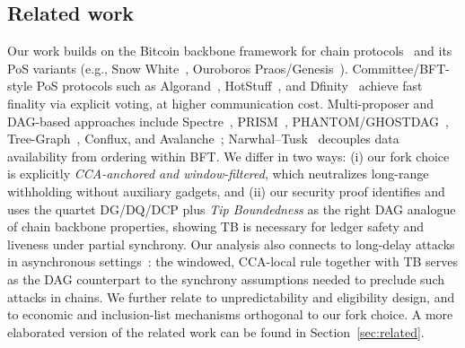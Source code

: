 \subsection{Related work} %
Our work builds on the Bitcoin backbone framework for chain protocols~\cite{EC:GarKiaLeo15} and its PoS variants (e.g., Snow White~\cite{FC:DaiPasShi19}, Ouroboros Praos/Genesis~\cite{EC:DGKR18,CCS:BGKRZ18}). Committee/BFT-style PoS protocols such as Algorand~\cite{Algorand}, HotStuff~\cite{HotStuff}, and Dfinity~\cite{Dfinity} achieve fast finality via explicit voting, at higher communication cost. Multi-proposer and DAG-based approaches include Spectre~\cite{EPRINT:MorKulYok18}, PRISM~\cite{Prism}, PHANTOM/GHOSTDAG~\cite{AFT:SWZ21}, Tree-Graph~\cite{EPRINT:ZhaChaLeo18},  Conflux, and Avalanche~\cite{SnowFamily}; Narwhal–Tusk~\cite{NarwhalTusk} decouples data availability from ordering within BFT. We differ in two ways: (i) our fork choice is explicitly \emph{CCA-anchored and window-filtered}, which neutralizes long-range withholding without auxiliary gadgets, and (ii) our security proof identifies and uses the quartet DG/DQ/DCP plus \emph{Tip Boundedness} as the right DAG analogue of chain backbone properties, showing TB is necessary for ledger safety and liveness under partial synchrony. Our analysis also connects to long-delay attacks in asynchronous settings~\cite{EC:PasSeeShe17}: the windowed, CCA-local rule together with TB serves as the DAG counterpart to the synchrony assumptions needed to preclude such attacks in chains. We further relate to unpredictability and eligibility design, and to economic and inclusion-list mechanisms orthogonal to our fork choice. 
A  more elaborated version of the related work can be found in Section~\ref{sec:related}. 
